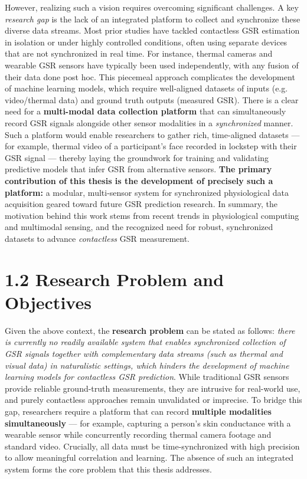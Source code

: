 However, realizing such a vision requires overcoming significant
challenges. A key \textit{research gap} is the lack of an integrated platform
to collect and synchronize these diverse data streams. Most prior
studies have tackled contactless GSR estimation in isolation or under
highly controlled conditions, often using separate devices that are not
synchronized in real
time\cite{ref13}\cite{ref14}.
For instance, thermal cameras and wearable GSR sensors have typically
been used independently, with any fusion of their data done post hoc.
This piecemeal approach complicates the development of machine learning
models, which require well-aligned datasets of inputs (e.g.
video/thermal data) and ground truth outputs (measured GSR). There is a
clear need for a \textbf{multi-modal data collection platform} that can
simultaneously record GSR signals alongside other sensor modalities in a
\textit{synchronized} manner. Such a platform would enable researchers to
gather rich, time-aligned datasets --- for example, thermal video of a
participant's face recorded in lockstep with their GSR signal --- thereby
laying the groundwork for training and validating predictive models that
infer GSR from alternative sensors. \textbf{The primary contribution of this
thesis is the development of precisely such a platform:} a modular,
multi-sensor system for synchronized physiological data acquisition
geared toward future GSR prediction research. In summary, the motivation
behind this work stems from recent trends in physiological computing and
multimodal sensing, and the recognized need for robust, synchronized
datasets to advance \textit{contactless} GSR measurement.

\section{1.2 Research Problem and Objectives}

Given the above context, the \textbf{research problem} can be stated as
follows: \textit{there is currently no readily available system that enables
synchronized collection of GSR signals together with complementary data
streams (such as thermal and visual data) in naturalistic settings,
which hinders the development of machine learning models for contactless
GSR prediction}. While traditional GSR sensors provide reliable
ground-truth measurements, they are intrusive for real-world use, and
purely contactless approaches remain unvalidated or
imprecise\cite{ref13}.
To bridge this gap, researchers require a platform that can record
\textbf{multiple modalities simultaneously} --- for example, capturing a
person's skin conductance with a wearable sensor while concurrently
recording thermal camera footage and standard video. Crucially, all data
must be time-synchronized with high precision to allow meaningful
correlation and learning. The absence of such an integrated system forms
the core problem that this thesis addresses.

